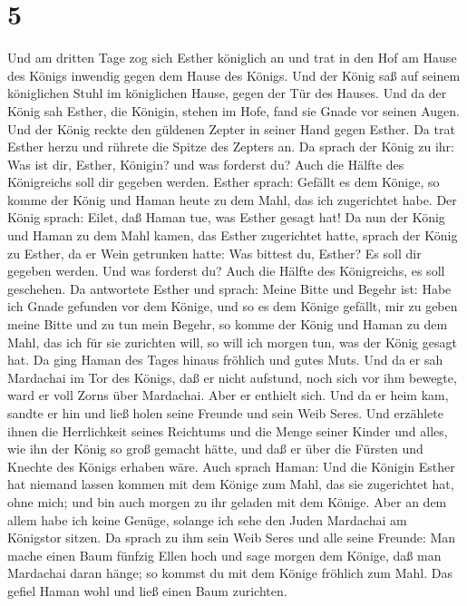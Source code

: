 \hypertarget{section-4}{%
\section{5}\label{section-4}}

 Und am dritten Tage zog sich Esther königlich an und trat
in den Hof am Hause des Königs inwendig gegen dem Hause des Königs. Und
der König saß auf seinem königlichen Stuhl im königlichen Hause, gegen
der Tür des Hauses.  Und da der König sah Esther, die
Königin, stehen im Hofe, fand sie Gnade vor seinen Augen. Und der König
reckte den güldenen Zepter in seiner Hand gegen Esther. Da trat Esther
herzu und rührete die Spitze des Zepters an.  Da sprach der
König zu ihr: Was ist dir, Esther, Königin? und was forderst du? Auch
die Hälfte des Königreichs soll dir gegeben werden.  Esther
sprach: Gefällt es dem Könige, so komme der König und Haman heute zu dem
Mahl, das ich zugerichtet habe.  Der König sprach: Eilet,
daß Haman tue, was Esther gesagt hat! Da nun der König und Haman zu dem
Mahl kamen, das Esther zugerichtet hatte,  sprach der König
zu Esther, da er Wein getrunken hatte: Was bittest du, Esther? Es soll
dir gegeben werden. Und was forderst du? Auch die Hälfte des
Königreichs, es soll geschehen.  Da antwortete Esther und
sprach: Meine Bitte und Begehr ist:  Habe ich Gnade gefunden
vor dem Könige, und so es dem Könige gefällt, mir zu geben meine Bitte
und zu tun mein Begehr, so komme der König und Haman zu dem Mahl, das
ich für sie zurichten will, so will ich morgen tun, was der König gesagt
hat.  Da ging Haman des Tages hinaus fröhlich und gutes
Muts. Und da er sah Mardachai im Tor des Königs, daß er nicht aufstund,
noch sich vor ihm bewegte, ward er voll Zorns über Mardachai.
 Aber er enthielt sich. Und da er heim kam, sandte er hin
und ließ holen seine Freunde und sein Weib Seres.  Und
erzählete ihnen die Herrlichkeit seines Reichtums und die Menge seiner
Kinder und alles, wie ihn der König so groß gemacht hätte, und daß er
über die Fürsten und Knechte des Königs erhaben wäre.  Auch
sprach Haman: Und die Königin Esther hat niemand lassen kommen mit dem
Könige zum Mahl, das sie zugerichtet hat, ohne mich; und bin auch morgen
zu ihr geladen mit dem Könige.  Aber an dem allem habe ich
keine Genüge, solange ich sehe den Juden Mardachai am Königstor sitzen.
 Da sprach zu ihm sein Weib Seres und alle seine Freunde:
Man mache einen Baum fünfzig Ellen hoch und sage morgen dem Könige, daß
man Mardachai daran hänge; so kommst du mit dem Könige fröhlich zum
Mahl. Das gefiel Haman wohl und ließ einen Baum zurichten.

